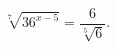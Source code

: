\begin{ex}[type=equation]
	\begin{condition}
		$\sqrt[7]{36^{x - 5}} = \dfrac{6}{\sqrt[5]{6}}.$
	\end{condition}
\end{ex}